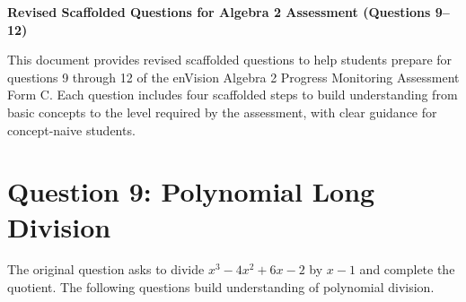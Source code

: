 \documentclass[12pt]{article}
\begin{document}
\begin{center}
    \textbf{Revised Scaffolded Questions for Algebra 2 Assessment (Questions 9--12)}
\end{center}

This document provides revised scaffolded questions to help students prepare for questions 9 through 12 of the enVision Algebra 2 Progress Monitoring Assessment Form C. Each question includes four scaffolded steps to build understanding from basic concepts to the level required by the assessment, with clear guidance for concept-naive students.

\section*{Question 9: Polynomial Long Division}
The original question asks to divide \( x^3 - 4x^2 + 6x - 2 \) by \( x - 1 \) and complete the quotient. The following questions build understanding of polynomial division.
\end{document}
